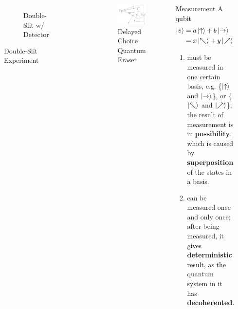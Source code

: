 \documentclass{beamer}
\begin{document}
\begin{frame}
\begin{columns}
\begin{figure}
\begin{subfigure}[b]{0.45\textwidth}
        \caption{Double-Slit w/ Detector}
        \label{fig:doube-slit-1}
      \end{subfigure}
      \caption{Double-Slit Experiment\tiny\cite{doubleslit}}
      \label{fig:doube-slit-2}
    \end{figure}
    \begin{figure}
      \includegraphics[scale=0.155]{figures/delayed-choice-quantum-eraser}
      \caption{Delayed Choice Quantum Eraser\tiny\cite{delayed}}
    \end{figure}

    \begin{block}{Measurement}
      A qubit
        \begin{align*}
        \ket{v} &= a\ket{\uparrow}+ b\ket{\rightarrow} \\
                &= x\ket{\nwarrow}+ y\ket{\nearrow}
        \label{eqn:qubit-bases}
        \end{align*}
      \begin{enumerate}[I]
        \item must be measured in one certain basis, e.g. \{$\ket{\uparrow}$ and $\ket{\rightarrow}$\},
          or \{$\ket{\nwarrow}$ and $\ket{\nearrow}$\};
          the result of measurement is in \textbf{possibility}, which is caused by \textbf{superposition} of the states in a basis.
        \item can be measured once and only once; after being measured, it gives \textbf{deterministic} result, as the quantum system in it has \textbf{decoherented}.
      \end{enumerate}
    \end{block}
  \end{columns}
\end{frame}
\end{document}
